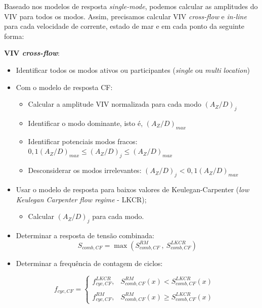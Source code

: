 Baseado nos modelos de resposta \textit{single-mode}, podemos calcular as amplitudes do VIV para todos os modos.
Assim, precisamos calcular VIV \textit{cross-flow} e \textit{in-line} para cada velocidade de corrente, estado de mar e em cada ponto da seguinte forma:

\textbf{VIV \textit{cross-flow}}:
\begin{itemize}
\item Identificar todos os modos ativos ou participantes (\textit{single} ou \textit{multi} \textit{location})
\item Com o modelo de resposta CF:
	\begin{itemize}
    \item Calcular a amplitude VIV normalizada para cada modo $(A_Z/D)_j$

	\item Identificar o modo dominante, isto é, $(A_Z/D)_\mathit{max}$

    \item Identificar potenciais modos fracos: $0,1(A_Z/D)_\mathit{max} \leq (A_Z/D)_j \leq (A_Z/D)_\mathit{max}$

    \item Desconsiderar os modos irrelevantes: $(A_Z/D)_j$ < $0,1(A_Z/D)_\mathit{max}$
    \end{itemize}
\item Usar o modelo de resposta para baixos valores de Keulegan-Carpenter (\textit{low Keulegan Carpenter flow regime} - LKCR);
	\begin{itemize}
	\item Calcular $(A_Z/D)_j$ para cada modo.
	\end{itemize}
\item Determinar a resposta de tensão combinada: \\
\[ S_{\mathit{comb}, \mathit{CF}} = \max\left( S_{\mathit{comb}, \mathit{CF}}^\mathit{RM} ~,~ S_{\mathit{comb}, \mathit{CF}}^\mathit{LKCR} \right) \]

\item Determinar a frequência de contagem de ciclos:

\[f_{\mathit{cyc}, \mathit{CF}} =
\left\{
\begin{matrix}
f_{\mathit{cyc}, \mathit{CF}}^\mathit{LKCR}, & S_{\mathit{comb},\mathit{CF}}^\mathit{RM}(x)    < S_{\mathit{comb},\mathit{CF}}^\mathit{LKCR}(x) & \\
\\
f_{\mathit{cyc}, \mathit{CF}}^\mathit{RM},   & S_{\mathit{comb},\mathit{CF}}^\mathit{RM}(x) \geq S_{\mathit{comb},\mathit{CF}}^\mathit{LKCR}(x)
\end{matrix}
\right.\]

\end{itemize}

